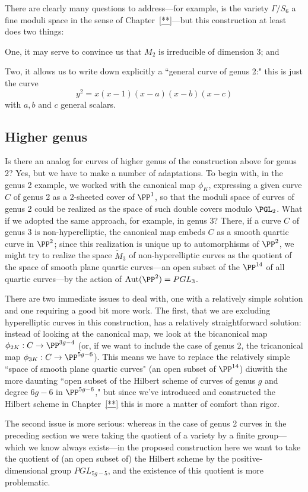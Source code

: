 There are clearly many questions to address---for example, is the variety $\Gamma/S_6$ a fine moduli space in the sense of Chapter~\ref{**}---but this construction at least does two things:

One, it may serve to convince us that $M_2$ is irreducible of dimension 3; and

Two, it allows us to write down explicitly a ``general curve of genus 2:" this is just the curve
$$
y^2 = x(x-1)(x-a)(x-b)(x-c)
$$
with $a, b$ and $c$ general scalars.

\subsection{Higher genus}

Is there an analog for curves of higher genus of the construction above for genus 2? Yes, but we have to make a number of adaptations. To begin with, in the genus 2 example, we worked with the canonical map $\phi_K$, expressing a given curve $C$ of genus 2 as a 2-sheeted cover of $\PP^1$, so that the moduli space of curves of genus 2 could be realized as the space of such double covers modulo $\PGL_2$. What if we adopted the same approach, for example, in genus 3? There, if a curve $C$ of genus 3 is non-hyperelliptic, the canonical map embeds $C$ as a smooth quartic curve in $\PP^2$; since this realization is unique up to automorphisms of $\PP^2$, we might try to realize the space $\tilde M_3$ of non-hyperelliptic curves as the quotient of the space of smooth plane quartic curves---an open subset of the $\PP^{14}$ of all quartic curves---by the action of ${\rm Aut}(\PP^2) = PGL_3$.

There are two immediate issues to deal with, one with a relatively simple solution and one requiring a good bit more work. The first, that we are excluding hyperelliptic curves in this construction, has a relatively straightforward solution: instead of looking at the canonical map, we look at the bicanonical map $\phi_{2K} : C \to \PP^{3g-4}$ (or, if we want to include the case of genus 2, the tricanonical map  $\phi_{3K} : C \to \PP^{5g-6}$). This means we have to replace the relatively simple ``space of smooth plane quartic curves" (an open subset of $\PP^{14}$) diuwith the more daunting ``open subset of the Hilbert scheme of curves of genus $g$ and degree $6g-6$ in $\PP^{5g-6}$," but since we've introduced and constructed the Hilbert scheme in Chapter~\ref{**} this is more a matter of comfort than rigor.

The second issue is more serious: whereas in the case of genus 2 curves in the preceding section we were taking the quotient of a variety by a finite group---which we know always exists---in the proposed construction here we want to take the quotient of (an open subset of) the Hilbert scheme by the positive-dimensional group $PGL_{5g-5}$, and the existence of this quotient is more problematic.

